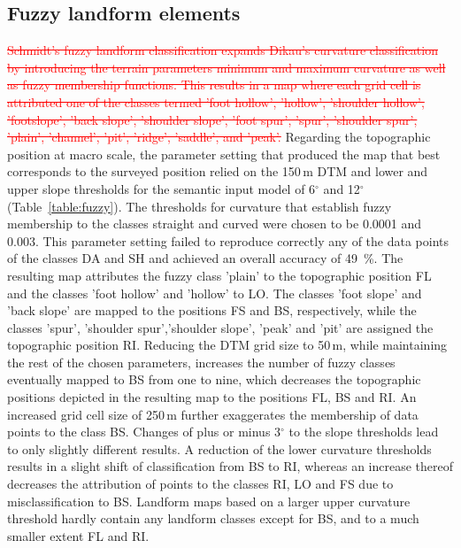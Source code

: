 \documentclass[preprint,12pt,authoryear]{elsarticle}
\begin{document}
\subsection{Fuzzy landform elements}
\textcolor{red}{\sout{Schmidt's fuzzy landform classification expands Dikau's curvature classification by introducing the terrain parameters minimum and maximum curvature as well as fuzzy membership functions. This results in a map where each grid cell is attributed one of the classes termed 'foot hollow', 'hollow', 'shoulder hollow', 'footslope', 'back slope', 'shoulder slope', 'foot spur', 'spur', 'shoulder spur', 'plain', 'channel', 'pit', 'ridge', 'saddle', and 'peak'.}}
Regarding the topographic position at macro scale, the parameter setting that produced the map that best corresponds to the surveyed position relied on the 150\,m DTM and lower and upper slope thresholds for the semantic input model of 6$^{\circ}$ and 12$^{\circ}$ (Table~\ref{table:fuzzy}). The thresholds for curvature that establish fuzzy membership to the classes straight and curved were chosen to be 0.0001 and 0.003. This parameter setting failed to reproduce correctly any of the data points of the classes DA and SH and achieved an overall accuracy of 49~\%. The resulting map attributes the fuzzy class 'plain' to the topographic position FL and the classes 'foot hollow' and 'hollow' to LO. The classes 'foot slope' and 'back slope' are mapped to the positions FS and BS, respectively, while the classes 'spur', 'shoulder spur','shoulder slope', 'peak' and 'pit' are assigned the topographic position RI. Reducing the DTM grid size to 50\,m, while maintaining the rest of the chosen parameters, increases the number of fuzzy classes eventually mapped to BS from one to nine, which decreases the topographic positions depicted in the resulting map to the positions FL, BS and RI. An increased grid cell size of 250\,m further exaggerates the membership of data points to the class BS. Changes of plus or minus 3$^{\circ}$ to the slope thresholds lead to only slightly different results. A reduction of the lower curvature thresholds results in a slight shift of classification from BS to RI, whereas an increase thereof decreases the attribution of points to the classes RI, LO and FS due to misclassification to BS. Landform maps based on a larger upper curvature threshold hardly contain any landform classes except for BS, and to a much smaller extent FL and RI.
\end{document}
